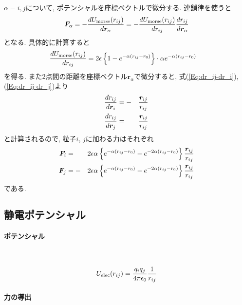 $\alpha = i, j$について, ポテンシャルを座標ベクトルで微分する. 連鎖律を使うと
\begin{equation}
   \bm{F}_{\alpha}
   =
   -
   \frac{d U_{\mathrm{morse}}(r_{ij})}{d \bm{r}_{\alpha}}
   =
   -
   \frac{d U_{\mathrm{morse}}(r_{ij})}{d r_{ij}}
   \frac{d r_{ij}}{d \bm{r}_{\alpha}}
   \notag
\end{equation}
となる. 具体的に計算すると
\begin{align}
   \frac{d U_{\mathrm{morse}}(r_{ij})}{d r_{ij}}
   &=
   2\epsilon
   \left\{
      1 - e^{-\alpha(r_{ij} - r_{0})}
   \right\}
   \cdot
   \alpha
   e^{-\alpha(r_{ij} - r_{0})}
   \notag
\end{align}
を得る. また2点間の距離を座標ベクトル$\bm{r}_{\alpha}$で微分すると, 式(\ref{Eq:dr_ij-dr_i}), (\ref{Eq:dr_ij-dr_j})より
\begin{alignat}{3}
   \frac{d r_{ij}}{d \bm{r}_{i}}
   &=
   -&&
   \frac{\bm{r}_{ij}}{r_{ij}}
   \notag
   \\
   \frac{d r_{ij}}{d \bm{r}_{j}}
   &=&&
   \frac{\bm{r}_{ij}}{r_{ij}}
   \notag
\end{alignat}
と計算されるので, 粒子$i$, $j$に加わる力はそれぞれ
\begin{alignat}{3}
   \bm{F}_{i}
   &=&&
   2\epsilon \alpha
   \left\{
      e^{-\alpha(r_{ij} - r_{0})}
      -
      e^{-2\alpha(r_{ij} - r_{0})}
   \right\}
   \frac{\bm{r}_{ij}}{r_{ij}}
   \notag \\
   \bm{F}_{j}
   &=
   -&&
   2\epsilon \alpha
   \left\{
      e^{-\alpha(r_{ij} - r_{0})}
      -
      e^{-2\alpha(r_{ij} - r_{0})}
   \right\}
   \frac{\bm{r}_{ij}}{r_{ij}}
   \notag
\end{alignat}
である.


\clearpage
\subsection{静電ポテンシャル}
\paragraph{ポテンシャル} \

\begin{equation}
U_{\mathrm{elec}}(r_{ij}) = \frac{q_{i}q_{j}}{4 \pi \epsilon_{0}}
                            \frac{1}{r_{ij}}
\notag                            
\end{equation}

\paragraph{力の導出} \

